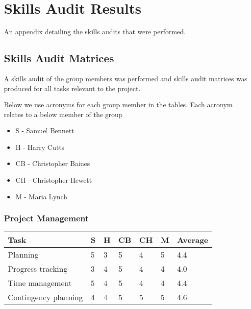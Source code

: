 \chapter{Skills Audit Results} \label{App:Skills Audit Results}

\begin{preamble}
	An appendix detailing the skills audits that were performed.
\end{preamble}

\section{Skills Audit Matrices} 
\label{Section:Skills Audit Matrices}
A skills audit of the group members was performed and skills audit matrices was produced for all tasks relevant to the project.

Below we use acronyms for each group member in the tables. Each acronym relates to a below member of the group

\begin{itemize}
\item S - Samuel Bennett
\item H - Harry Cutts
\item CB - Christopher Baines
\item CH - Christopher Hewett
\item M - Maria Lynch
\end{itemize}

\subsection{Project Management} 
\begin{tabular}{ l || l | l | l | l | l || l}
  Task & S & H & CB & CH & M & Average \\ \hline
  Planning & 5  &  3  &  5  &  4  &  5  &  4.4 \\ 
  Progress tracking &  3  &  4  &  5  &  4  &  4  &  4.0 \\
  Time management &  5  &  4  &  5  &  4  &  4  &  4.4 \\
  Contingency planning &  4  &  4  &  5  &  5  &  5  &  4.6 \\
\end{tabular}


